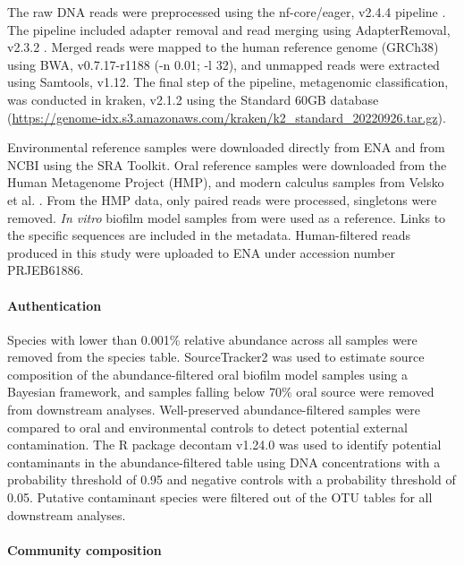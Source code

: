 \documentclass[10pt,a4paper]{article}
\begin{document}
The raw DNA reads were preprocessed using the nf-core/eager, v2.4.4
pipeline \citep{yatesEAGER2020}. The pipeline included adapter removal
and read merging using AdapterRemoval, v2.3.2 \citep{AdapterRemovalv2}.
Merged reads were mapped to the human reference genome (GRCh38) using
BWA, v0.7.17-r1188 \citep{BWA} (-n 0.01; -l 32), and unmapped reads were
extracted using Samtools, v1.12. The final step of the pipeline,
metagenomic classification, was conducted in kraken, v2.1.2
\citep{kraken2} using the Standard 60GB database
(\url{https://genome-idx.s3.amazonaws.com/kraken/k2_standard_20220926.tar.gz}).

Environmental reference samples were downloaded directly from ENA and
from NCBI using the SRA Toolkit. Oral reference samples were downloaded
from the Human Metagenome Project (HMP), and modern calculus samples
from Velsko et al. \citeyearpar{velskoDentalCalculus2017}. From the HMP
data, only paired reads were processed, singletons were removed.
\emph{In vitro} biofilm model samples from
\citet{edlundUncoveringComplex2018} were used as a reference. Links to
the specific sequences are included in the metadata. Human-filtered
reads produced in this study were uploaded to ENA under accession number
PRJEB61886.

\paragraph{Authentication}\label{authentication}

Species with lower than 0.001\% relative abundance across all samples
were removed from the species table. SourceTracker2
\citep{knightsSourceTracker2011} was used to estimate source composition
of the abundance-filtered oral biofilm model samples using a Bayesian
framework, and samples falling below 70\% oral source were removed from
downstream analyses. Well-preserved abundance-filtered samples were
compared to oral and environmental controls to detect potential external
contamination. The R package decontam v1.24.0 \citep{Rdecontam} was used
to identify potential contaminants in the abundance-filtered table using
DNA concentrations with a probability threshold of 0.95 and negative
controls with a probability threshold of 0.05. Putative contaminant
species were filtered out of the OTU tables for all downstream analyses.

\paragraph{Community composition}\label{community-composition}
\end{document}
